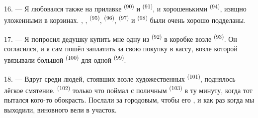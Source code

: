 16. --- Я любовался также на прилавке  \textsuperscript{(90)} и
 \textsuperscript{(91)}, и хорошенькими
 \textsuperscript{(94)}, изящно уложенными в
корзинах. , ,  \textsuperscript{(95)},
 \textsuperscript{(96)},  \textsuperscript{(97)} и
 \textsuperscript{(98)} были очень хорошо подделаны.

\VUsaut{4.4mm}
\VUsaut{2.8mm}

17. --- Я попросил дедушку купить мне одну из 
\textsuperscript{(92)} в коробке возле  \textsuperscript{(93)}. Он
согласился, и я сам пошёл заплатить за свою покупку в кассу, возле которой
увязывали большой  \textsuperscript{(100)} для одной
 \textsuperscript{(99)}.

18. --- Вдруг среди людей, стоявших возле художественных 
\textsuperscript{(101)}, поднялось лёгкое смятение.  \textsuperscript{(102)}
только что поймал с поличным  \textsuperscript{(103)} в
ту минуту, когда тот пытался кого-то обокрасть. Послали за городовым, чтобы
его , и как раз когда мы выходили, виновного вели в
участок.
\VUsaut{6.0mm}
\VUfilet{22mm}
